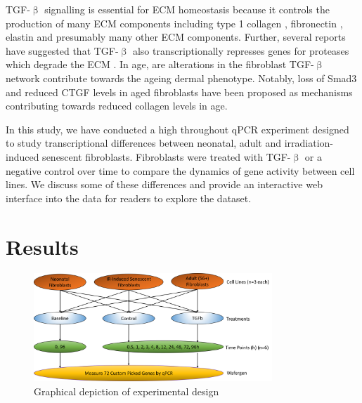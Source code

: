 \documentclass[alpha-refs]{wiley-article}
\newcommand{\tgf}{TGF-$\upbeta$}
\begin{document}
\tgf{} signalling is essential for ECM homeostasis because it controls the production of many ECM components including type 1 collagen \citep{Varani2006, Varga1987}, fibronectin \citep{Ignotz1986}, elastin \citep{Kuang2007} and presumably many other ECM components. Further, several reports have suggested that \tgf{} also transcriptionally represses genes for proteases which degrade the ECM \citep{White2000, Yuan2001, Edwards1996}. In age, are alterations in the fibroblast \tgf{} network contribute towards the ageing dermal phenotype. Notably, loss of Smad3 \citep{Purohit2016} and reduced CTGF levels in aged fibroblasts have been proposed as mechanisms contributing towards reduced collagen levels in age.

In this study, we have conducted a high throughout qPCR experiment designed to study transcriptional differences between neonatal, adult and irradiation-induced senescent fibroblasts. Fibroblasts were treated with \tgf{} or a negative control over time to compare the dynamics of gene activity between cell lines. We discuss some of these differences and provide an interactive web interface into the data for readers to explore the dataset. 
%
\section{Results}
\begin{figure}
	\centering
	\includegraphics[width=0.8\textwidth]{img/ExperimentDesign}
	\caption{Graphical depiction of experimental design}
	\label{fig:exp_design}
\end{figure}
\end{document}
